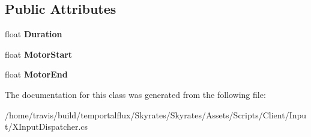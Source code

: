 \subsection*{Public Attributes}
\begin{DoxyCompactItemize}
\item 
\hypertarget{class_skyrates_1_1_client_1_1_input_1_1_x_input_dispatcher_1_1_pulse_a47ce72df82bf2a4f4474d45e238d04c9}{float {\bfseries Duration}}\label{class_skyrates_1_1_client_1_1_input_1_1_x_input_dispatcher_1_1_pulse_a47ce72df82bf2a4f4474d45e238d04c9}

\item 
\hypertarget{class_skyrates_1_1_client_1_1_input_1_1_x_input_dispatcher_1_1_pulse_a5f9b43b20bf6a10c7433e3f995504704}{float {\bfseries Motor\-Start}}\label{class_skyrates_1_1_client_1_1_input_1_1_x_input_dispatcher_1_1_pulse_a5f9b43b20bf6a10c7433e3f995504704}

\item 
\hypertarget{class_skyrates_1_1_client_1_1_input_1_1_x_input_dispatcher_1_1_pulse_a636425c095036c9cf34e77404b905d37}{float {\bfseries Motor\-End}}\label{class_skyrates_1_1_client_1_1_input_1_1_x_input_dispatcher_1_1_pulse_a636425c095036c9cf34e77404b905d37}

\end{DoxyCompactItemize}


The documentation for this class was generated from the following file\-:\begin{DoxyCompactItemize}
\item 
/home/travis/build/temportalflux/\-Skyrates/\-Skyrates/\-Assets/\-Scripts/\-Client/\-Input/X\-Input\-Dispatcher.\-cs\end{DoxyCompactItemize}
